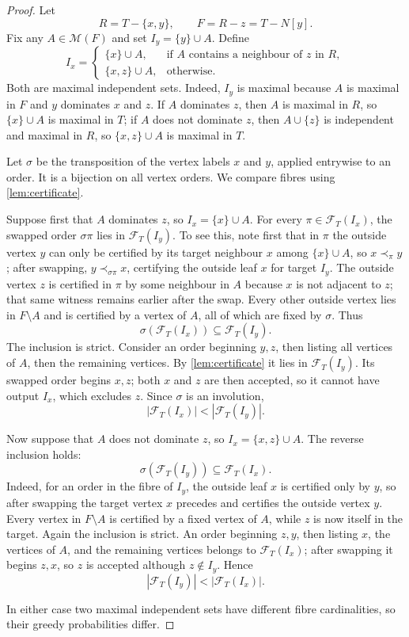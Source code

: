 \documentclass[11pt]{article}
\theoremstyle{definition}
\newcommand{\M}{\mathcal{M}}
\begin{document}
\begin{proof}
Let
\[
 R=T-\{x,y\},\qquad F=R-z=T-N[y].
\]
Fix any $A\in\M(F)$ and set $I_y=\{y\}\cup A$.  Define
\[
 I_x=
 \begin{cases}
  \{x\}\cup A, & \text{if $A$ contains a neighbour of $z$ in $R$},\\
  \{x,z\}\cup A, & \text{otherwise}.
 \end{cases}
\]
Both are maximal independent sets.  Indeed, $I_y$ is maximal because $A$ is maximal in $F$ and $y$ dominates $x$ and $z$.  If $A$ dominates $z$, then $A$ is maximal in $R$, so $\{x\}\cup A$ is maximal in $T$; if $A$ does not dominate $z$, then $A\cup\{z\}$ is independent and maximal in $R$, so $\{x,z\}\cup A$ is maximal in $T$.

Let $\sigma$ be the transposition of the vertex labels $x$ and $y$, applied entrywise to an order.  It is a bijection on all vertex orders.  We compare fibres using \cref{lem:certificate}.

Suppose first that $A$ dominates $z$, so $I_x=\{x\}\cup A$.  For every $\pi\in\mathcal F_T(I_x)$, the swapped order $\sigma\pi$ lies in $\mathcal F_T(I_y)$.  To see this, note first that in $\pi$ the outside vertex $y$ can only be certified by its target neighbour $x$ among $\{x\}\cup A$, so $x\prec_\pi y$; after swapping, $y\prec_{\sigma\pi}x$, certifying the outside leaf $x$ for target $I_y$.  The outside vertex $z$ is certified in $\pi$ by some neighbour in $A$ because $x$ is not adjacent to $z$; that same witness remains earlier after the swap.  Every other outside vertex lies in $F\setminus A$ and is certified by a vertex of $A$, all of which are fixed by $\sigma$.  Thus
\[
 \sigma(\mathcal F_T(I_x))\subseteq\mathcal F_T(I_y).
\]
The inclusion is strict.  Consider an order beginning $y,z$, then listing all vertices of $A$, then the remaining vertices.  By \cref{lem:certificate} it lies in $\mathcal F_T(I_y)$.  Its swapped order begins $x,z$; both $x$ and $z$ are then accepted, so it cannot have output $I_x$, which excludes $z$.  Since $\sigma$ is an involution,
\[
 |\mathcal F_T(I_x)|<|\mathcal F_T(I_y)|.
\]

Now suppose that $A$ does not dominate $z$, so $I_x=\{x,z\}\cup A$.  The reverse inclusion holds:
\[
 \sigma(\mathcal F_T(I_y))\subseteq\mathcal F_T(I_x).
\]
Indeed, for an order in the fibre of $I_y$, the outside leaf $x$ is certified only by $y$, so after swapping the target vertex $x$ precedes and certifies the outside vertex $y$.  Every vertex in $F\setminus A$ is certified by a fixed vertex of $A$, while $z$ is now itself in the target.  Again the inclusion is strict.  An order beginning $z,y$, then listing $x$, the vertices of $A$, and the remaining vertices belongs to $\mathcal F_T(I_x)$; after swapping it begins $z,x$, so $z$ is accepted although $z\notin I_y$.  Hence
\[
 |\mathcal F_T(I_y)|<|\mathcal F_T(I_x)|.
\]

In either case two maximal independent sets have different fibre cardinalities, so their greedy probabilities differ.
\end{proof}
\end{document}
